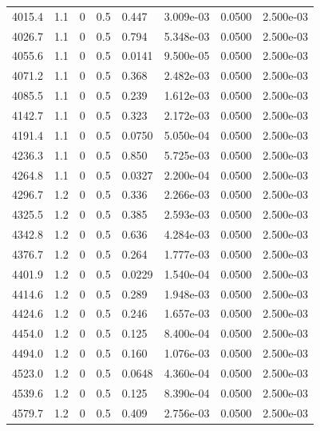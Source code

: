 \documentclass[preview]{standalone}
\begin{document}
{{{{{\begin{tabular}{L{1.2cm}C{1.2cm} C{0.3cm}C{0.5cm} C{1.4cm}C{1.4cm} C{1.4cm}C{1.4cm}}
  4015.4  &   1.1  & 0     & 0.5 &  0.447  & 3.009e-03  & 0.0500 &  2.500e-03   \\ 
  4026.7  &   1.1  & 0     & 0.5 &  0.794  & 5.348e-03  & 0.0500 &  2.500e-03   \\ 
  4055.6  &   1.1  & 0     & 0.5 &  0.0141  & 9.500e-05  & 0.0500 &  2.500e-03   \\ 
  4071.2  &   1.1  & 0     & 0.5 &  0.368  & 2.482e-03  & 0.0500 &  2.500e-03   \\ 
  4085.5  &   1.1  & 0     & 0.5 &  0.239  & 1.612e-03  & 0.0500 &  2.500e-03   \\ 
  4142.7  &   1.1  & 0     & 0.5 &  0.323  & 2.172e-03  & 0.0500 &  2.500e-03   \\ 
  4191.4  &   1.1  & 0     & 0.5 &  0.0750  & 5.050e-04  & 0.0500 &  2.500e-03   \\ 
  4236.3  &   1.1  & 0     & 0.5 &  0.850  & 5.725e-03  & 0.0500 &  2.500e-03   \\ 
  4264.8  &   1.1  & 0     & 0.5 &  0.0327  & 2.200e-04  & 0.0500 &  2.500e-03   \\ 
  4296.7  &   1.2  & 0     & 0.5 &  0.336  & 2.266e-03  & 0.0500 &  2.500e-03   \\ 
  4325.5  &   1.2  & 0     & 0.5 &  0.385  & 2.593e-03  & 0.0500 &  2.500e-03   \\ 
  4342.8  &   1.2  & 0     & 0.5 &  0.636  & 4.284e-03  & 0.0500 &  2.500e-03   \\ 
  4376.7  &   1.2  & 0     & 0.5 &  0.264  & 1.777e-03  & 0.0500 &  2.500e-03   \\ 
  4401.9  &   1.2  & 0     & 0.5 &  0.0229  & 1.540e-04  & 0.0500 &  2.500e-03   \\ 
  4414.6  &   1.2  & 0     & 0.5 &  0.289  & 1.948e-03  & 0.0500 &  2.500e-03   \\ 
  4424.6  &   1.2  & 0     & 0.5 &  0.246  & 1.657e-03  & 0.0500 &  2.500e-03   \\ 
  4454.0  &   1.2  & 0     & 0.5 &  0.125  & 8.400e-04  & 0.0500 &  2.500e-03   \\ 
  4494.0  &   1.2  & 0     & 0.5 &  0.160  & 1.076e-03  & 0.0500 &  2.500e-03   \\ 
  4523.0  &   1.2  & 0     & 0.5 &  0.0648  & 4.360e-04  & 0.0500 &  2.500e-03   \\ 
  4539.6  &   1.2  & 0     & 0.5 &  0.125  & 8.390e-04  & 0.0500 &  2.500e-03   \\ 
  4579.7  &   1.2  & 0     & 0.5 &  0.409  & 2.756e-03  & 0.0500 &  2.500e-03   \\ 

\end{tabular}}}}}}
\end{document}
